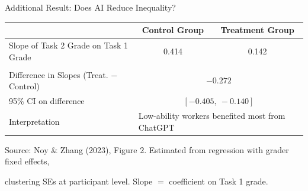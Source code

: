 \documentclass[hyperref={pdfpagelabels=false}]{beamer}
\begin{document}
	\begin{frame}{Additional Result: Does AI Reduce Inequality?}
		\begin{center}
			\begin{threeparttable}
				\linespread{1}
				\fontsize{8.5}{8.5pt}\selectfont
				\centering
				\begin{tabular}{@{}lcc@{}}
					\toprule
					& Control Group & Treatment Group \\
					\midrule\midrule
					Slope of Task 2 Grade on Task 1 Grade & 0.414 & 0.142 \\
					& & \\
					\midrule
					Difference in Slopes (Treat. $-$ Control) & \multicolumn{2}{c}{$-0.272$} \\
					95\% CI on difference & \multicolumn{2}{c}{$[-0.405, \ -0.140]$} \\
					\midrule\midrule
					Interpretation & \multicolumn{2}{l}{Low-ability workers benefited most from ChatGPT} \\
					\bottomrule
				\end{tabular}
				\begin{tablenotes}
					\fontsize{7}{7pt}\selectfont
					\item Source: Noy \& Zhang (2023), Figure 2. Estimated from regression with grader fixed effects,
					\item clustering SEs at participant level. Slope $=$ coefficient on Task 1 grade.
				\end{tablenotes}
			\end{threeparttable}
		\end{center}
	\end{frame}
	
\end{document}
